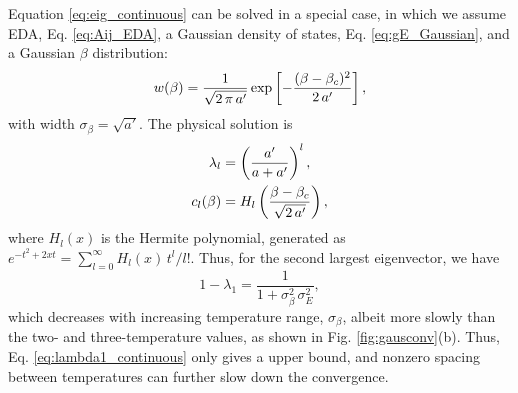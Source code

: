 \documentclass[reprint,aip,jcp,superscriptaddress]{revtex4-1}
\begin{document}
Equation \eqref{eq:eig_continuous}
can be solved in a special case, in which
we assume EDA, Eq. \eqref{eq:Aij_EDA},
a Gaussian density of states,
Eq. \eqref{eq:gE_Gaussian},
and
a Gaussian $\beta$ distribution:
%
\begin{align}
w(\beta)
=
\frac{1}{\sqrt{2 \, \pi \, a'}}
\exp\left[
  -\frac{ (\beta - \beta_c)^2 }{ 2 \, a' }
\right],
\notag
\end{align}
%
with width $\sigma_\beta = \sqrt{a'}$.
%
%
%
The physical solution is
%
\begin{align}
\lambda_l
&=
\left(
  \frac { a' } { a + a' }
\right)^l,
\notag
\\
c_l(\beta)
&=
H_l\left(
  \frac{ \beta - \beta_c }
  { \sqrt{ 2 \, a' } }
\right),
\notag
\end{align}
%
where
$H_l(x)$
is the Hermite polynomial\cite{
arfken, *abramowitz, *wang_specfunc},
generated as
$e^{-t^2 + 2x t} = \sum_{l = 0}^\infty H_l(x) \, t^l/l!$.
%
Thus, for the second largest eigenvector,
we have
%
\begin{equation}
1 - \lambda_1
=
\frac{1}
{ 1 + \sigma_\beta^2 \, \sigma_E^2},
\label{eq:lambda1_continuous}
\end{equation}
%
which decreases
with increasing temperature range,
$\sigma_\beta$,
albeit more slowly than
the two- and three-temperature values,
as shown in Fig. \ref{fig:gausconv}(b).
%
Thus,
Eq. \eqref{eq:lambda1_continuous}
only gives a upper bound,
and nonzero spacing between temperatures
can further slow down the convergence.




\end{document}
